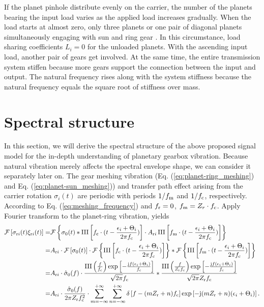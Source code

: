\documentclass[a4paper,fleqn]{cas-sc}%
\begin{document}
\par If the planet pinhole distribute evenly on the carrier, the number of the planets bearing the input load varies as the applied load increases gradually. When the load starts at almost zero, only three planets or one pair of diagonal planets simultaneously engaging with sun and ring gear \cite{Ligata2009}. In this circumstance, load sharing coefficients $L_i=0$ for the unloaded planets. With the ascending input load, another pair of gears get involved. At the same time, the entire transmission system stiffen because more gears support the connection between the input and output. The natural frequency rises along with the system stiffness because the natural frequency equals the square root of stiffness over mass.
\section{Spectral structure \label{sec:spectral_structure}}
\par In this section, we will derive the spectral structure of the above proposed signal model for the in-depth understanding of planetary gearbox vibration. Because natural vibration merely affects the spectral envelope shape, we can consider it separately later on. The gear meshing vibration (Eq. (\ref{eq:planet-ring_meshing}) and Eq. (\ref{eq:planet-sun_meshing})) and transfer path effect arising from the carrier rotation $\sigma_{i}(t)$ are periodic with periods $1/f_{\rm m}$ and $1/f_{\rm c}$, respectively. According to Eq. (\ref{eq:meshing_frequency}) and $f_{\rm r}=0$, $f_{\rm m}=Z_{r} \cdot f_{\rm c}$. Apply Fourier transform to the planet-ring vibration, yields
\begin{equation}
\begin{split}
    \mathcal{F}\left[ \sigma_{{\rm r}i}(t) \xi_{{\rm r}i}(t) \right]=&\mathcal{F}\left\{\sigma_0(t) \ast \operatorname{III}\left[f_{\rm c} \cdot (t - \frac{\epsilon_i+\Theta_i}{2 \pi f_{\rm c}})\right] \cdot A_{{\rm r}i}\operatorname{III}\left[f_{\rm m} \cdot (t-\frac{\epsilon_i+\Theta_i}{2 \pi f_{\rm c}})\right]\right\}\\
    =&A_{{\rm r}i} \cdot \mathcal{F}\left[\sigma_0(t)\right] \cdot \mathcal{F}\left\{\operatorname{III}\left[f_{\rm c} \cdot (t - \frac{\epsilon_i+\Theta_i}{2 \pi f_{\rm c}})\right] \right\}
    \ast \mathcal{F}\left\{ \operatorname{III}\left[f_{\rm m} \cdot (t-\frac{\epsilon_i+\Theta_i}{2 \pi f_{\rm c}})\right] \right\}\\
=&A_{{\rm r}i} \cdot \hat{\sigma}_0(f) \cdot \frac{\operatorname{III}\left(\frac{f}{f_{\rm c}}\right) \exp\left[-\frac{{\rm j} f (\epsilon_i+\Theta_i)}{f_{\rm c}}\right]}{\sqrt{2 \pi} f_{\rm c}} \ast \frac{\operatorname{III}\left(\frac{f}{ Z_{\rm r} f_{\rm c}}\right) \exp\left[-\frac{{\rm j} f (\epsilon_i+\Theta_i)}{ f_{\rm c}}\right]}{\sqrt{2 \pi } Z_{\rm r}f_{\rm c}}\\
=&A_{{\rm r}i} \cdot \frac{\hat{\sigma}_0(f)}{2 \pi Z_{\rm r} f_{\rm c}^{2}} \cdot \sum_{m=-\infty}^{+\infty} \sum_{n=-\infty}^{+\infty} \delta\left[f-(mZ_{\rm r}+n)f_{\rm c}\right] \exp\left[-{\rm j}(m Z_{\rm r}+n)(\epsilon_i+\Theta_i)\right].
\end{split}
\end{equation}
\end{document}
